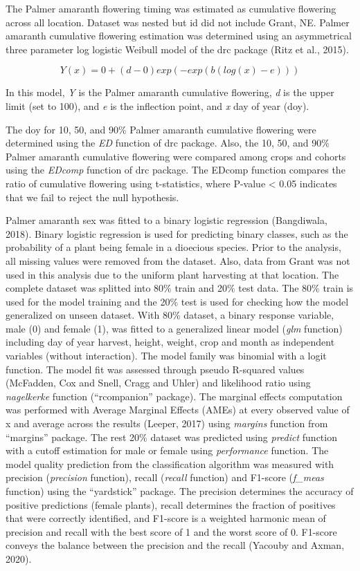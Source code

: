\documentclass[utf8]{frontiersSCNS}
\begin{document}
The Palmer amaranth flowering timing was estimated as cumulative
flowering across all location. Dataset was nested but id did not include
Grant, NE. Palmer amaranth cumulative flowering estimation was
determined using an asymmetrical three parameter log logistic Weibull
model of the drc package (Ritz et al., 2015).

\[Y(x) = 0 + (d-0) exp (-exp(b(log(x)-e)))\]

In this model, \emph{Y} is the Palmer amaranth cumulative flowering,
\emph{d} is the upper limit (set to 100), and \emph{e} is the inflection
point, and \emph{x} day of year (doy).

The doy for 10, 50, and 90\% Palmer amaranth cumulative flowering were
determined using the \emph{ED} function of drc package. Also, the 10,
50, and 90\% Palmer amaranth cumulative flowering were compared among
crops and cohorts using the \emph{EDcomp} function of drc package. The
EDcomp function compares the ratio of cumulative flowering using
t-statistics, where P-value \textless{} 0.05 indicates that we fail to
reject the null hypothesis.

Palmer amaranth sex was fitted to a binary logistic regression
(Bangdiwala, 2018). Binary logistic regression is used for predicting
binary classes, such as the probability of a plant being female in a
dioecious species. Prior to the analysis, all missing values were
removed from the dataset. Also, data from Grant was not used in this
analysis due to the uniform plant harvesting at that location. The
complete dataset was splitted into 80\% train and 20\% test data. The
80\% train is used for the model training and the 20\% test is used for
checking how the model generalized on unseen dataset. With 80\% dataset,
a binary response variable, male (0) and female (1), was fitted to a
generalized linear model (\emph{glm} function) including day of year
harvest, height, weight, crop and month as independent variables
(without interaction). The model family was binomial with a logit
function. The model fit was assessed through pseudo R-squared values
(McFadden, Cox and Snell, Cragg and Uhler) and likelihood ratio using
\emph{nagelkerke} function (``rcompanion'' package). The marginal
effects computation was performed with Average Marginal Effects (AMEs)
at every observed value of x and average across the results (Leeper,
2017) using \emph{margins} function from ``margins'' package. The rest
20\% dataset was predicted using \emph{predict} function with a cutoff
estimation for male or female using \emph{performance} function. The
model quality prediction from the classification algorithm was measured
with precision (\emph{precision} function), recall (\emph{recall}
function) and F1-score (\emph{f\_meas} function) using the ``yardstick''
package. The precision determines the accuracy of positive predictions
(female plants), recall determines the fraction of positives that were
correctly identified, and F1-score is a weighted harmonic mean of
precision and recall with the best score of 1 and the worst score of 0.
F1-score conveys the balance between the precision and the recall
(Yacouby and Axman, 2020).
\end{document}
